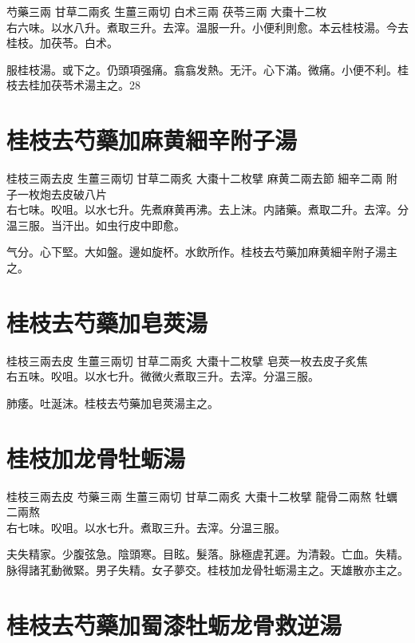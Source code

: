 芍藥{\scriptsize 三兩} 甘草{\scriptsize 二兩炙} 生薑{\scriptsize 三兩切} 白术{\scriptsize 三兩} 茯苓{\scriptsize 三兩} 大棗{\scriptsize 十二枚}\\
右六味。以水八升。煮取三升。去滓。温服一升。小便利則愈。本云桂枝湯。今去桂枝。加茯苓。白术。

服桂枝湯。{\khaaitp 或}下之。仍頭項强痛。翕翕发熱。无汗。心下滿。微痛。小便不利。桂枝去桂加茯苓术湯主之。28

\section{桂枝去芍藥加麻黄細辛附子湯}

桂枝{\scriptsize 三兩去皮} 生薑{\scriptsize 三兩切} 甘草{\scriptsize 二兩炙} 大棗{\scriptsize 十二枚擘} 麻黄{\scriptsize 二兩去節} 細辛{\scriptsize 二兩} 附子{\scriptsize 一枚炮去皮破八片}\\
右七味。㕮咀。以水七升。先煮麻黄再沸。去上沫。内諸藥。煮取二升。去滓。分温三服。当汗出。如虫行皮中即愈。

气分。心下堅。大如盤。邊如旋杯。水飲所作。桂枝去芍藥加麻黄細辛附子湯主之。

\section{桂枝去芍藥加皂莢湯}

桂枝{\scriptsize 三兩去皮} 生薑{\scriptsize 三兩切} 甘草{\scriptsize 二兩炙} 大棗{\scriptsize 十二枚擘} 皂莢{\scriptsize 一枚去皮子炙焦}\\
右五味。㕮咀。以水七升。微微火煮取三升。去滓。分温三服。

肺痿。吐涎沫。桂枝去芍藥加皂莢湯主之。

\section{桂枝加龙骨牡蛎湯}

桂枝{\scriptsize 三兩去皮} 芍藥{\scriptsize 三兩} 生薑{\scriptsize 三兩切} 甘草{\scriptsize 二兩炙} 大棗{\scriptsize 十二枚擘} 龍骨{\scriptsize 二兩熬} 牡蠣{\scriptsize 二兩熬}\\
右七味。㕮咀。以水七升。煮取三升。去滓。分温三服。

夫失精家。少腹弦急。陰頭寒。目眩。髮落。脉極虗芤遲。为清穀。亡血。失精。脉得諸芤動微緊。男子失精。女子夢交。桂枝加龙骨牡蛎湯主之。天雄散亦主之。

\section{桂枝去芍藥加蜀漆牡蛎龙骨救逆湯}

